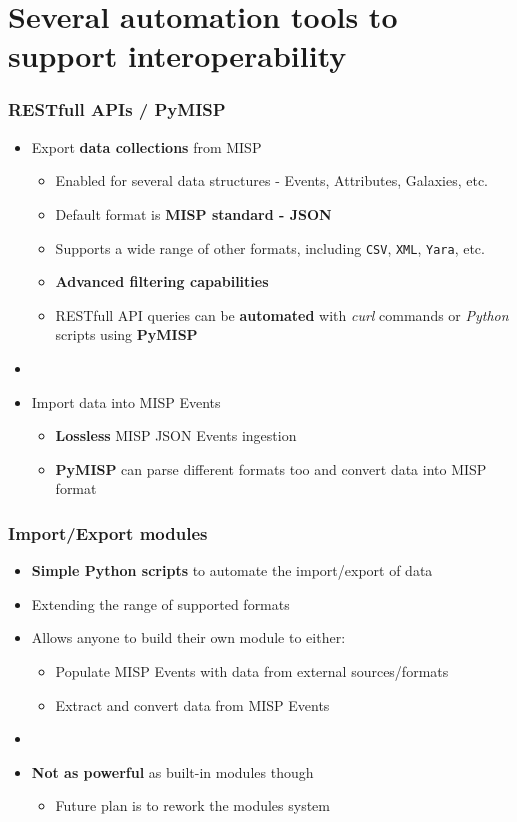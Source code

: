 \section{Several automation tools to \\ support interoperability}

\begin{frame}
    \frametitle{RESTfull APIs / PyMISP}
    \begin{itemize}
        \item Export \textbf{data collections} from MISP
        \begin{itemize}
            \item Enabled for several data structures - Events, Attributes, Galaxies, etc.
            \item Default format is \textbf{MISP standard - JSON}
            \item Supports a wide range of other formats, including \texttt{CSV}, \texttt{XML}, \texttt{Yara}, etc.
            \item \textbf{Advanced filtering capabilities}
            \item RESTfull API queries can be \textbf{automated} with \textit{curl} commands or \textit{Python} scripts using \textbf{PyMISP}
        \end{itemize}
        \item []
        \item Import data into MISP Events
        \begin{itemize}
            \item \textbf{Lossless} MISP JSON Events ingestion
            \item \textbf{PyMISP} can parse different formats too and convert data into MISP format
        \end{itemize}
    \end{itemize}
\end{frame}

\begin{frame}
    \frametitle{Import/Export modules}
    \begin{itemize}
        \item \textbf{Simple Python scripts} to automate the import/export of data
        \item Extending the range of supported formats
        \item Allows anyone to build their own module to either:
        \begin{itemize}
            \item Populate MISP Events with data from external sources/formats
            \item Extract and convert data from MISP Events
        \end{itemize}
        \item []
        \item \textbf{Not as powerful} as built-in modules though
        \begin{itemize}
            \item Future plan is to rework the modules system
        \end{itemize}
    \end{itemize}
\end{frame}

